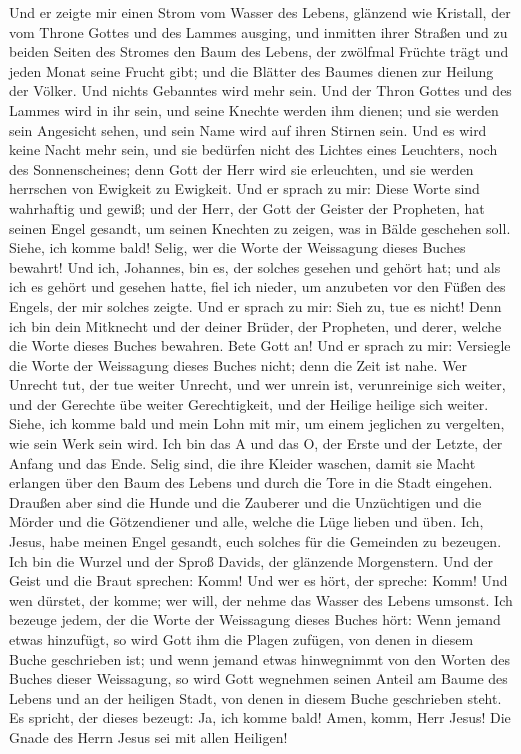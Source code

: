  Und er zeigte mir einen Strom vom Wasser des Lebens,
glänzend wie Kristall, der vom Throne Gottes und des Lammes ausging,
 und inmitten ihrer Straßen und zu beiden Seiten des
Stromes den Baum des Lebens, der zwölfmal Früchte trägt und jeden Monat
seine Frucht gibt; und die Blätter des Baumes dienen zur Heilung der
Völker.  Und nichts Gebanntes wird mehr sein. Und der
Thron Gottes und des Lammes wird in ihr sein, und seine Knechte werden
ihm dienen;  und sie werden sein Angesicht sehen, und sein
Name wird auf ihren Stirnen sein.  Und es wird keine Nacht
mehr sein, und sie bedürfen nicht des Lichtes eines Leuchters, noch des
Sonnenscheines; denn Gott der Herr wird sie erleuchten, und sie werden
herrschen von Ewigkeit zu Ewigkeit.  Und er sprach zu mir:
Diese Worte sind wahrhaftig und gewiß; und der Herr, der Gott der
Geister der Propheten, hat seinen Engel gesandt, um seinen Knechten zu
zeigen, was in Bälde geschehen soll.  Siehe, ich komme
bald! Selig, wer die Worte der Weissagung dieses Buches bewahrt!
 Und ich, Johannes, bin es, der solches gesehen und gehört
hat; und als ich es gehört und gesehen hatte, fiel ich nieder, um
anzubeten vor den Füßen des Engels, der mir solches zeigte.
 Und er sprach zu mir: Sieh zu, tue es nicht! Denn ich bin
dein Mitknecht und der deiner Brüder, der Propheten, und derer, welche
die Worte dieses Buches bewahren. Bete Gott an!  Und er
sprach zu mir: Versiegle die Worte der Weissagung dieses Buches nicht;
denn die Zeit ist nahe.  Wer Unrecht tut, der tue weiter
Unrecht, und wer unrein ist, verunreinige sich weiter, und der Gerechte
übe weiter Gerechtigkeit, und der Heilige heilige sich weiter.
 Siehe, ich komme bald und mein Lohn mit mir, um einem
jeglichen zu vergelten, wie sein Werk sein wird.  Ich bin
das A und das O, der Erste und der Letzte, der Anfang und das Ende.
 Selig sind, die ihre Kleider waschen, damit sie Macht
erlangen über den Baum des Lebens und durch die Tore in die Stadt
eingehen.  Draußen aber sind die Hunde und die Zauberer
und die Unzüchtigen und die Mörder und die Götzendiener und alle, welche
die Lüge lieben und üben.  Ich, Jesus, habe meinen Engel
gesandt, euch solches für die Gemeinden zu bezeugen. Ich bin die Wurzel
und der Sproß Davids, der glänzende Morgenstern.  Und der
Geist und die Braut sprechen: Komm! Und wer es hört, der spreche: Komm!
Und wen dürstet, der komme; wer will, der nehme das Wasser des Lebens
umsonst.  Ich bezeuge jedem, der die Worte der Weissagung
dieses Buches hört: Wenn jemand etwas hinzufügt, so wird Gott ihm die
Plagen zufügen, von denen in diesem Buche geschrieben ist;
 und wenn jemand etwas hinwegnimmt von den Worten des
Buches dieser Weissagung, so wird Gott wegnehmen seinen Anteil am Baume
des Lebens und an der heiligen Stadt, von denen in diesem Buche
geschrieben steht.  Es spricht, der dieses bezeugt: Ja,
ich komme bald! Amen, komm, Herr Jesus!  Die Gnade des
Herrn Jesus sei mit allen Heiligen!
